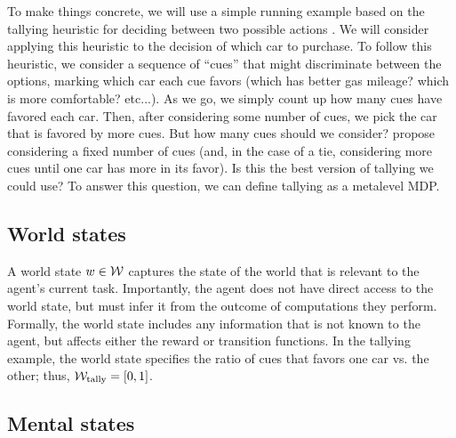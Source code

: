To make things concrete, we will use a simple running example based on the tallying heuristic for deciding between two possible actions \citep{gigerenzer2011heuristic}. We will consider applying this heuristic to the decision of which car to purchase. To follow this heuristic, we consider a sequence of ``cues'' that might discriminate between the options, marking which car each cue favors (which has better gas mileage? which is more comfortable? etc...). As we go, we simply count up how many cues have favored each car. Then, after considering some number of cues, we pick the car that is favored by more cues. But how many cues should we consider? \citeauthor{gigerenzer2011heuristic} propose considering a fixed number of cues (and, in the case of a tie, considering more cues until one car has more in its favor). Is this the best version of tallying we could use? To answer this question, we can define tallying as a metalevel MDP.

\subsection{World states}
A world state $w \in \mathcal{W}$ captures the state of the world that is relevant to the agent's current task. Importantly, the agent does not have direct access to the world state, but must infer it from the outcome of computations they perform. Formally, the world state includes any information that is not known to the agent, but affects either the reward or transition functions. In the tallying example, the world state specifies the ratio of cues that favors one car vs. the other; thus, $\mathcal{W}_{\text{tally}} = [0, 1]$. 



\subsection{Mental states}

